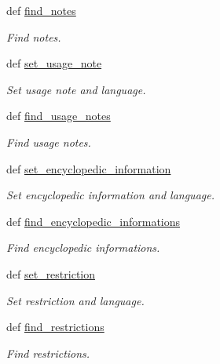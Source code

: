\begin{DoxyCompactItemize}
def \hyperlink{classlmf_1_1src_1_1core_1_1definition_1_1_definition_ac69af5c460f62f3525f328f72a757f44}{find\+\_\+notes}
\begin{DoxyCompactList}\small\item\em Find notes. \end{DoxyCompactList}\item 
def \hyperlink{classlmf_1_1src_1_1core_1_1definition_1_1_definition_aa9b1e94875d795552b55ef6745dfa4aa}{set\+\_\+usage\+\_\+note}
\begin{DoxyCompactList}\small\item\em Set usage note and language. \end{DoxyCompactList}\item 
def \hyperlink{classlmf_1_1src_1_1core_1_1definition_1_1_definition_a1fb127330544e562c532ff6cc54a5153}{find\+\_\+usage\+\_\+notes}
\begin{DoxyCompactList}\small\item\em Find usage notes. \end{DoxyCompactList}\item 
def \hyperlink{classlmf_1_1src_1_1core_1_1definition_1_1_definition_ab0719eea86eb9ebe2c85b5f4d5f03317}{set\+\_\+encyclopedic\+\_\+information}
\begin{DoxyCompactList}\small\item\em Set encyclopedic information and language. \end{DoxyCompactList}\item 
def \hyperlink{classlmf_1_1src_1_1core_1_1definition_1_1_definition_a18af1b8027e329565084177a1723eec8}{find\+\_\+encyclopedic\+\_\+informations}
\begin{DoxyCompactList}\small\item\em Find encyclopedic informations. \end{DoxyCompactList}\item 
def \hyperlink{classlmf_1_1src_1_1core_1_1definition_1_1_definition_a5d622049382265fe2c289c72afeb2467}{set\+\_\+restriction}
\begin{DoxyCompactList}\small\item\em Set restriction and language. \end{DoxyCompactList}\item 
def \hyperlink{classlmf_1_1src_1_1core_1_1definition_1_1_definition_a9ae73ad0e8acd4e2712ce7c7703a9ca8}{find\+\_\+restrictions}
\begin{DoxyCompactList}\small\item\em Find restrictions. \end{DoxyCompactList}\item 

\end{DoxyCompactItemize}
